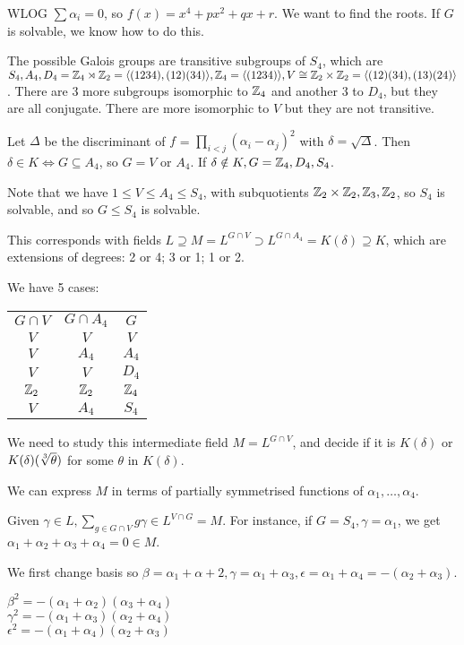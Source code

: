 \documentclass[10pt,a4paper]{article}
\begin{document}
WLOG $\sum \alpha_i = 0$, so $f(x) = x^4 + px^2+ qx+r$. We want to find the roots. If $G$ is solvable, we know how to do this.

The possible Galois groups are transitive subgroups of $S_4$, which are $S_4, A_4, D_4 = \mathbb{Z}_4 \rtimes \mathbb{Z}_2 = \langle (1234),(12)(34) \rangle, \mathbb{Z}_4 = \langle (1234) \rangle, V \cong \mathbb{Z}_2 \times \mathbb{Z}_2 = \langle (12)(34), (13)(24) \rangle$. There are $3$ more subgroups isomorphic to $\mathbb{Z}_4$ and another $3$ to $D_4$, but they are all conjugate. There are more isomorphic to $V$ but they are not transitive.

Let $\Delta$ be the discriminant of $f$ = $\prod_{i<j} (\alpha_i-\alpha_j)^2$ with $\delta = \sqrt{\Delta}$. Then $\delta \in K \iff G \subseteq A_4$, so $G = V$ or $A_4$. If $\delta \notin K, G = \mathbb{Z}_4, D_4, S_4$.

Note that we have $1 \leq V \leq A_4 \leq S_4$, with subquotients $\mathbb{Z}_2 \times \mathbb{Z}_2, \mathbb{Z}_3, \mathbb{Z}_2$, so $S_4$ is solvable, and so $G \leq S_4$ is solvable. 

This corresponds with fields $L \supseteq M = L^{G \cap  V} \supset L^{G \cap A_4} = K(\delta) \supseteq K$, which are extensions of degrees: 2 or 4; 3 or 1; 1 or 2.

We have 5 cases:
\begin{tabular}{c|c|c}
$G\cap V$ & $G \cap A_4$ & $G$ \\
$V$&$V$&$V$\\
$V$&$A_4$&$A_4$\\
$V$&$V$&$D_4$\\
$\mathbb{Z}_2$&$\mathbb{Z}_2$&$\mathbb{Z}_4$\\
$V$&$A_4$&$S_4$
\end{tabular}

We need to study this intermediate field $M = L^{G \cap V}$, and decide if it is $K(\delta)$ or $K(\delta)(\sqrt[3]{\theta})$ for some $\theta$ in $K(\delta)$.

We can express $M$ in terms of partially symmetrised functions of $\alpha_1, \ldots, \alpha_4$.

Given $\gamma \in L, \sum_{g \in G \cap V} g\gamma \in L^{V \cap G} = M$. For instance, if $G = S_4, \gamma= \alpha_1$, we get $\alpha_1+\alpha_2+\alpha_3+\alpha_4 = 0 \in M$.

We first change basis so $\beta = \alpha_1+\alpha+2, \gamma = \alpha_1+\alpha_3, \epsilon = \alpha_1+ \alpha_4 = -(\alpha_2+\alpha_3)$.

$\beta^2 = -(\alpha_1+\alpha_2)(\alpha_3+\alpha_4)$\\
$\gamma^2 = -(\alpha_1+\alpha_3)(\alpha_2+\alpha_4)$\\
$\epsilon^2 = -(\alpha_1+\alpha_4)(\alpha_2+\alpha_3)$
\end{document}
